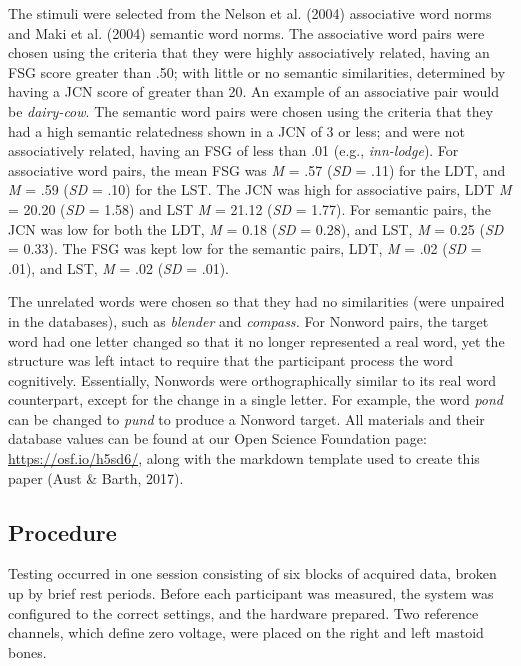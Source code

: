 \documentclass[english,man]{apa6}
\theoremstyle{definition}
\theoremstyle{definition}
\theoremstyle{definition}
\theoremstyle{remark}
\begin{document}
The stimuli were selected from the Nelson et al. (2004) associative word
norms and Maki et al. (2004) semantic word norms. The associative word
pairs were chosen using the criteria that they were highly associatively
related, having an FSG score greater than .50; with little or no
semantic similarities, determined by having a JCN score of greater than
20. An example of an associative pair would be \emph{dairy-cow}. The
semantic word pairs were chosen using the criteria that they had a high
semantic relatedness shown in a JCN of 3 or less; and were not
associatively related, having an FSG of less than .01 (e.g.,
\emph{inn-lodge}). For associative word pairs, the mean FSG was \emph{M}
= .57 (\emph{SD} = .11) for the LDT, and \emph{M} = .59 (\emph{SD} =
.10) for the LST. The JCN was high for associative pairs, LDT \emph{M} =
20.20 (\emph{SD} = 1.58) and LST \emph{M} = 21.12 (\emph{SD} = 1.77).
For semantic pairs, the JCN was low for both the LDT, \emph{M} = 0.18
(\emph{SD} = 0.28), and LST, \emph{M} = 0.25 (\emph{SD} = 0.33). The FSG
was kept low for the semantic pairs, LDT, \emph{M} = .02 (\emph{SD} =
.01), and LST, \emph{M} = .02 (\emph{SD} = .01).

The unrelated words were chosen so that they had no similarities (were
unpaired in the databases), such as \emph{blender} and \emph{compass.}
For Nonword pairs, the target word had one letter changed so that it no
longer represented a real word, yet the structure was left intact to
require that the participant process the word cognitively. Essentially,
Nonwords were orthographically similar to its real word counterpart,
except for the change in a single letter. For example, the word
\emph{pond} can be changed to \emph{pund} to produce a Nonword target.
All materials and their database values can be found at our Open Science
Foundation page: \url{https://osf.io/h5sd6/}, along with the markdown
template used to create this paper (Aust \& Barth, 2017).

\subsection{Procedure}\label{procedure}

Testing occurred in one session consisting of six blocks of acquired
data, broken up by brief rest periods. Before each participant was
measured, the system was configured to the correct settings, and the
hardware prepared. Two reference channels, which define zero voltage,
were placed on the right and left mastoid bones.
\end{document}
